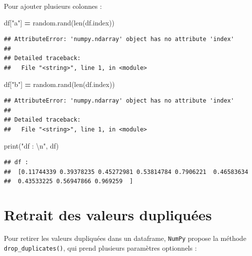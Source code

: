\documentclass[12pt,]{book}
\newenvironment{Shaded}{\begin{snugshade}}{\end{snugshade}}
\newcommand{\CharTok}[1]{\textcolor[rgb]{0.31,0.60,0.02}{#1}}
\newcommand{\StringTok}[1]{\textcolor[rgb]{0.31,0.60,0.02}{#1}}
\newcommand{\OperatorTok}[1]{\textcolor[rgb]{0.81,0.36,0.00}{\textbf{#1}}}
\newcommand{\BuiltInTok}[1]{#1}
\newcommand{\NormalTok}[1]{#1}
\numberwithin{equation}{section}
\numberwithin{countremarque}{section}
\begin{document}
Pour ajouter plusieurs colonnes :

\begin{Shaded}
\begin{Highlighting}[]
\NormalTok{df[}\StringTok{"a"}\NormalTok{] }\OperatorTok{=}\NormalTok{ random.rand(}\BuiltInTok{len}\NormalTok{(df.index))}
\end{Highlighting}
\end{Shaded}

\begin{lstlisting}
## AttributeError: 'numpy.ndarray' object has no attribute 'index'
## 
## Detailed traceback: 
##   File "<string>", line 1, in <module>
\end{lstlisting}

\begin{Shaded}
\begin{Highlighting}[]
\NormalTok{df[}\StringTok{"b"}\NormalTok{] }\OperatorTok{=}\NormalTok{ random.rand(}\BuiltInTok{len}\NormalTok{(df.index))}
\end{Highlighting}
\end{Shaded}

\begin{lstlisting}
## AttributeError: 'numpy.ndarray' object has no attribute 'index'
## 
## Detailed traceback: 
##   File "<string>", line 1, in <module>
\end{lstlisting}

\begin{Shaded}
\begin{Highlighting}[]
\BuiltInTok{print}\NormalTok{(}\StringTok{"df : }\CharTok{\textbackslash{}n}\StringTok{"}\NormalTok{, df)}
\end{Highlighting}
\end{Shaded}

\begin{lstlisting}
## df : 
##  [0.11744339 0.39378235 0.45272981 0.53814784 0.7906221  0.46583634
##  0.43533225 0.56947866 0.969259  ]
\end{lstlisting}

\section{Retrait des valeurs
dupliquées}\label{retrait-des-valeurs-dupliquees}

Pour retirer les valeurs dupliquées dans un dataframe, \texttt{NumPy}
propose la méthode \texttt{drop\_duplicates()}, qui prend plusieurs
paramètres optionnels :
\end{document}
